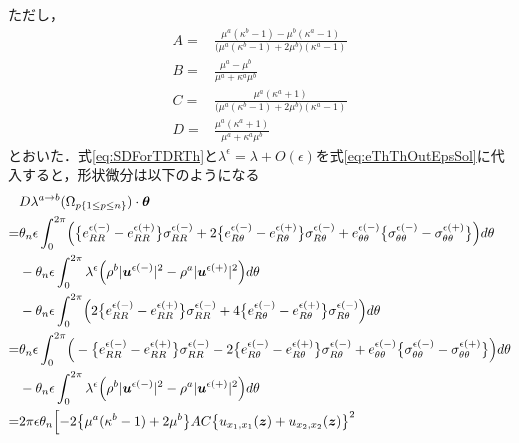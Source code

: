ただし，
\begin{align}
	A=&\frac{\mu^{a}(\kappa^{b}-1)-\mu^{b}(\kappa^{a}-1)}
	{\bigl(\mu^{a}(\kappa^{b}-1)+2\mu^{b}\bigr)(\kappa^{a}-1)}
	\nonumber
	\\
	B=&\frac{\mu^{a}-\mu^{b}}
	{\mu^{a}+\kappa^{a}\mu^{b}}
	\nonumber
	\\
	C=&\frac{\mu^{a}(\kappa^{a}+1)}
	{\bigl(\mu^{a}(\kappa^{b}-1)+2\mu^{b}\bigr)(\kappa^{a}-1)}
	\nonumber
	\\
	D=&\frac{\mu^{a}(\kappa^{a}+1)}
	{\mu^{a}+\kappa^{a}\mu^{b}}
	\label{eq:eThThOutEpsSol}
\end{align}
とおいた．式\eqref{eq:SDForTDRTh}と$\lambda^\epsilon=\lambda+O(\epsilon)$を式\eqref{eq:eThThOutEpsSol}に代入すると，形状微分は以下のようになる
\begin{align}
	&D\lambda^{a\rightarrow b}(\Omega_{p\{1\leq p\leq n\}})\cdot\bm{\theta}
	\nonumber
	\\
	=&\theta_{n}\epsilon\int_{0}^{2\pi}
		\Bigr(\bigl\{e_{RR}^{\epsilon(-)}-e_{RR}^{\epsilon(+)}\bigr\}\sigma_{RR}^{\epsilon(-)}
		+2\bigl\{e_{R\theta}^{\epsilon(-)}-e_{R\theta}^{\epsilon(+)}\bigr\}\sigma_{R\theta}^{\epsilon(-)}
		+e_{\theta\theta}^{\epsilon(-)}\bigl\{\sigma_{\theta\theta}^{\epsilon(-)}-\sigma_{\theta\theta}^{\epsilon(+)}\bigr\}
		\Bigl) d\theta
		\nonumber
		\\
	&-\theta_{n}\epsilon\int_{0}^{2\pi}
		\lambda^{\epsilon}\Bigr(
		\rho^{b}|\bm{u}^{\epsilon(-)}|^{2}-\rho^{a}|\bm{u}^{\epsilon(+)}|^{2}
		\Bigl) d\theta
		\nonumber
		\\
	&-\theta_{n}\epsilon\int_{0}^{2\pi}\Bigr(
		2\bigl\{e_{RR}^{\epsilon(-)}-e_{RR}^{\epsilon(+)}\bigr\}\sigma_{RR}^{\epsilon(-)}
		+4\bigl\{e_{R\theta}^{\epsilon(-)}-e_{R\theta}^{\epsilon(+)}\bigr\}\sigma_{R\theta}^{\epsilon(-)}
		\Bigl) d\theta
	\nonumber
	\\
	=&\theta_{n}\epsilon\int_{0}^{2\pi}
		\Bigr(-\bigl\{e_{RR}^{\epsilon(-)}-e_{RR}^{\epsilon(+)}\bigr\}\sigma_{RR}^{\epsilon(-)}
		-2\bigl\{e_{R\theta}^{\epsilon(-)}-e_{R\theta}^{\epsilon(+)}\bigr\}\sigma_{R\theta}^{\epsilon(-)}
		+e_{\theta\theta}^{\epsilon(-)}\bigl\{\sigma_{\theta\theta}^{\epsilon(-)}-\sigma_{\theta\theta}^{\epsilon(+)}\bigr\}
		\Bigl) d\theta
		\nonumber
		\\
	&-\theta_{n}\epsilon\int_{0}^{2\pi}
		\lambda^{\epsilon}\Bigr(
		\rho^{b}|\bm{u}^{\epsilon(-)}|^{2}-\rho^{a}|\bm{u}^{\epsilon(+)}|^{2}
		\Bigl) d\theta
	\nonumber
	\\
	=&2\pi\epsilon\theta_{n}\Bigl[
	-2\bigl\{\mu^{a}(\kappa^{b}-1)+2\mu^{b}\bigr\}AC
		\bigl\{u_{x_{1},x_{1}}(\bm{z})+u_{x_{2},x_{2}}(\bm{z})\bigr\}^2

\end{align}
